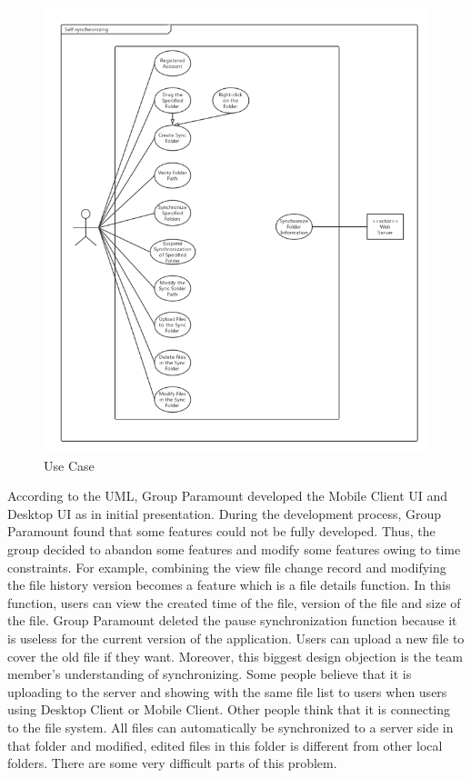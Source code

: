 \documentclass[11pt]{article}
\begin{document}
	\begin{figure}[htbp]
		\centering
		\includegraphics[width=12cm]{1.png}
		\caption{Use Case}
	\end{figure}
According to the UML, Group Paramount developed the Mobile Client UI and Desktop UI as in initial presentation. During the development process, Group Paramount found that some features could not be fully developed. Thus, the group decided to abandon some features and modify some features owing to time constraints. For example, combining the view file change record and modifying the file history version becomes a feature which is a file details function. In this function, users can view the created time of the file, version of the file and size of the file. Group Paramount deleted the pause synchronization function because it is useless for the current version of the application. Users can upload a new file to cover the old file if they want. Moreover, this biggest design objection is the team member's understanding of synchronizing. Some people believe that it is uploading to the server and showing with the same file list to users when users using Desktop Client or Mobile Client. Other people think that it is connecting to the file system. All files can automatically be synchronized to a server side in that folder and modified, edited files in this folder is different from other local folders. There are some very difficult parts of this problem.
\end{document}
